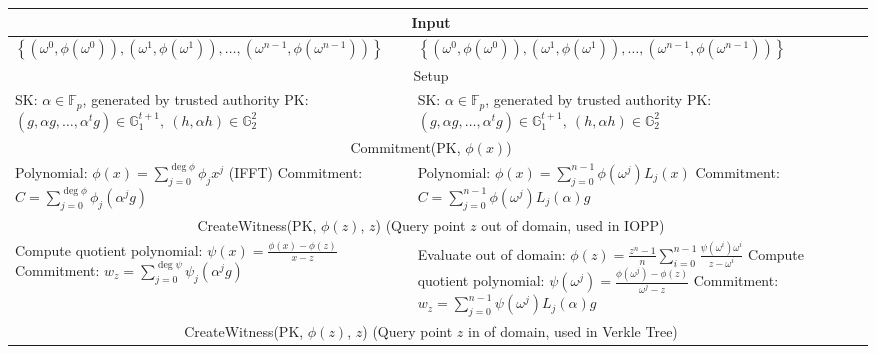 \begin{table}[!htp]
\begin{tabularx}{\textwidth}{|X|X|X|}
        \multicolumn{2}{|c|}{Input} \\ \hline
        $\left\{ (\omega^0, \phi(\omega^0)), (\omega^1, \phi(\omega^1)), \ldots,(\omega^{n-1}, \phi(\omega^{n-1})) \right\}$
        & $\left\{ (\omega^0, \phi(\omega^0)), (\omega^1, \phi(\omega^1)), \ldots,(\omega^{n-1}, \phi(\omega^{n-1})) \right\}$ \\ \hline
        \multicolumn{2}{|c|}{Setup} \\ \hline
        SK: $\alpha \in \mathbb{F}_p$, generated by trusted authority \newline
        PK: $\left(g,\alpha g, \ldots, \alpha^t g\right)\in \mathbb{G}_1^{t+1},\ \left(h, \alpha h\right) \in \mathbb{G}_2^2$
        &
        SK: $\alpha \in \mathbb{F}_p$, generated by trusted authority \newline
        PK: $\left(g,\alpha g, \ldots, \alpha^t g\right)\in \mathbb{G}_1^{t+1},\ \left(h, \alpha h\right) \in \mathbb{G}_2^2$ \\ \hline
        \multicolumn{2}{|c|}{Commitment(PK, $\phi(x)$)} \\
        \hline
        Polynomial: $\displaystyle \phi(x)=\sum_{j=0}^{\deg\phi}\phi_jx^j$ (IFFT) \newline
        Commitment: $\displaystyle C=\sum_{j=0}^{\deg\phi}\phi_j(\alpha^jg)$
        &
        Polynomial: $\displaystyle \phi(x)=\sum_{j=0}^{n-1}\phi(\omega^j)L_j(x)$ \newline
        Commitment: $\displaystyle C=\sum_{j=0}^{n-1}\phi(\omega^j)L_j(\alpha)g$ \\ \hline
        \multicolumn{2}{|c|}{
            CreateWitness(PK, $\phi(z)$, $z$) \quad
            (Query point $z$ out of domain, used in IOPP)
        } \\ \hline
        Compute quotient polynomial: $\displaystyle \psi(x)=\frac{\phi(x)-\phi(z)}{x-z}$ \newline
        Commitment: $\displaystyle w_z=\sum_{j=0}^{\deg\psi}\psi_j(\alpha^jg)$
        &
        Evaluate out of domain: $\displaystyle \phi(z)=\frac{z^n-1}{n}\sum_{i=0}^{n-1}\frac{\psi(\omega^i)\omega^i}{z-\omega^i}$ \newline
        Compute quotient polynomial: $\displaystyle \psi(\omega^j)=\frac{\phi(\omega^j)-\phi(z)}{\omega^j-z}$ \newline
        Commitment: $\displaystyle w_z=\sum_{j=0}^{n-1}\psi(\omega^j)L_j(\alpha)g$ \\ \hline
        \multicolumn{2}{|c|}{
            CreateWitness(PK, $\phi(z)$, $z$) \quad
            (Query point $z$ in of domain, used in Verkle Tree)
}
\end{tabularx}
\end{table}
